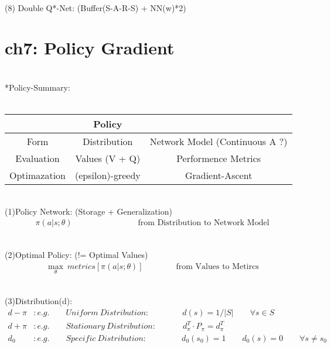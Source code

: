 \documentclass{article}
\begin{document}
~ \\[48pt]
(8) Double Q*-Net: \qquad (Buffer(S-A-R-S) + NN(w)*2) 


\newpage
\section*{ch7: Policy Gradient}


~ \\[3pt]
\centering
*Policy-Summary: \\[3pt]
~ \\[3pt]
\begin{tabular}{ccc}  %

    \toprule 
        & \qquad \qquad \qquad \qquad \qquad \qquad \qquad Policy & \\[3pt]
    \midrule 
        Form          & Distribution        & Network Model (Continuous A ?) \\[3pt]
        Evaluation    & Values (V + Q)      & Performence Metrics   \\[3pt]
        Optimazation  & (epsilon)-greedy    & Gradient-Ascent      \\[3pt]
    \bottomrule 

\end{tabular}
\flushleft


~ \\[3pt]
(1)Policy Network: (Storage + Generalization) 
\begin{align*}
    \pi (a | s; \theta ) 
    \qquad \qquad \qquad \qquad \text{from Distribution to Network Model} 
\end{align*}

~ \\[3pt]
(2)Optimal Policy: (!= Optimal Values) 
\begin{align*}
    \max_{\theta} \ metrics[ \pi (a | s; \theta ) ] 
    \qquad \qquad \text{from Values to Metircs} 
\end{align*}

~ \\[3pt]
(3)Distribution(d): 
\begin{align*}
    d - \pi &: e.g. 
            \qquad Uniform \ Distribution : \qquad \qquad 
            d(s) = 1 / | S | \qquad \forall s \in S \\[3pt]
    d + \pi &: e.g. 
            \qquad Stationary \ Distribution : \qquad \quad \ 
            d_{\pi}^{T} \cdot P_{\pi} = d_{\pi}^{T} \\[3pt]
    d_{0}   &: e.g. 
            \qquad Specific \ Distribution : \qquad \qquad \ 
            d_{0}(s_{0}) = 1 
            \qquad  d_{0}(s) = 0 \qquad \forall s \neq s_{0} 
\end{align*}
\end{document}
